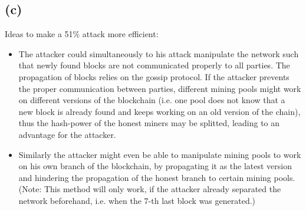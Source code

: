 \documentclass[12pt,pdftex,a4paper]{article}
\begin{document}
\subsection*{(c)}
Ideas to make a 51\% attack more efficient:
\begin{itemize}
\item The attacker could simultaneously to his attack manipulate the network such that newly found blocks are not communicated properly to all parties. The propagation of blocks relies on the gossip protocol. If the attacker prevents the proper communication between parties, different mining pools might work on different versions of the blockchain (i.e. one pool does not know that a new block is already found and keeps working on an old version of the chain), thus the hash-power of the honest miners may be splitted, leading to an advantage for the attacker.
\item Similarly the attacker might even be able to manipulate mining pools to work on his own branch of the blockchain, by propagating it as the latest version and hindering the propagation of the honest branch to certain mining pools. (Note: This method will only work, if the attacker already separated the network beforehand, i.e. when the 7-th last block was generated.)
\end{itemize}
\end{document}
